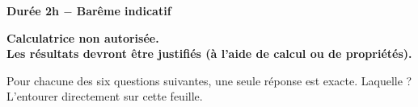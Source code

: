 \documentclass[11pt,a4paper]{article}  %
\begin{document}
	\graphicspath{{images/}}
	
	\begin{center}
		
		
	\end{center}

\begin{center}\textbf{Durée 2h $-$ Barême indicatif}\end{center}
\begin{center}\textbf{Calculatrice non autorisée.\\Les résultats devront être justifiés (à l'aide de calcul ou de propriétés).}\end{center}



Pour chacune des six questions suivantes, une seule réponse est exacte. Laquelle ? L'entourer directement sur cette feuille.
\end{document}
